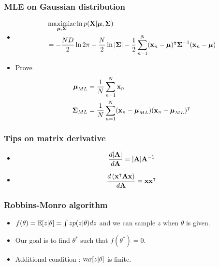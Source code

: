 \documentclass[10pt,mathserif]{beamer}
\begin{document}
\begin{frame}
\frametitle{MLE on Gaussian distribution}
\begin{itemize}\itemsep=12pt
    \item 
        \begin{align}
            &\operatorname*{maximize}_{\boldsymbol{\mu}, \boldsymbol{\Sigma}} \ln p(\mathbf{X}|\boldsymbol{\mu}, \boldsymbol{\Sigma})\nonumber\\
            &=-\frac{ND}{2} \ln 2\pi - \frac{N}{2} \ln |\boldsymbol{\Sigma}| - \frac{1}{2} \sum_{n=1}^N (\mathbf{x}_n-\boldsymbol{\mu})^\intercal \boldsymbol{\Sigma}^{-1} (\mathbf{x}_n-\boldsymbol{\mu}) \nonumber
        \end{align}
    \item Prove
        \begin{align}
            \boldsymbol{\mu}_{ML} &= \frac{1}{N} \sum_{n=1}^N \mathbf{x}_n\nonumber\\
            \boldsymbol{\Sigma}_{ML} &= \frac{1}{N} \sum_{n=1}^N (\mathbf{x}_n - \boldsymbol{\mu}_{ML})(\mathbf{x}_n - \boldsymbol{\mu}_{ML})^\intercal\nonumber
        \end{align}
\end{itemize}
\end{frame}
\begin{frame}
\frametitle{Tips on matrix derivative}
\begin{itemize}\itemsep=12pt
    \item 
        \begin{align}
            \frac{d|\mathbf{A}|}{d\mathbf{A}} = |\mathbf{A}|\mathbf{A}^{-1}\nonumber
        \end{align}
    \item 
        \begin{align}
            \frac{d\left(\mathbf{x}^\intercal \mathbf{A} \mathbf{x} \right)}{d\mathbf{A}} = \mathbf{x}\mathbf{x}^\intercal \nonumber
        \end{align}

\end{itemize}
\end{frame}
\begin{frame}
\frametitle{Robbins-Monro algorithm}
\begin{itemize}\itemsep=12pt
    \item $f(\theta) = \mathbb{E} [z|\theta] = \int z p(z|\theta) dz$ and we can sample $z$ when $\theta$ is given.
    \item Our goal is to find $\theta^{*}$ such that $f(\theta^{*}) = 0$.
    \item Additional condition : $\mathrm{var}[z|\theta]$ is finite.
\end{itemize}
\end{frame}
\end{document}
